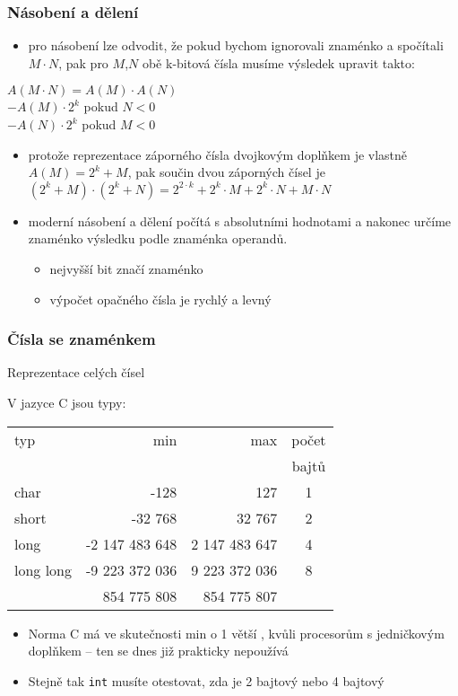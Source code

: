 \documentclass{beamer}
\begin{document}
\begin{frame}
\frametitle{Násobení a dělení}

\begin{itemize}
\item pro násobení lze odvodit, že pokud bychom ignorovali znaménko a spočítali $M\cdot N$, pak pro $M$,$N$ obě k-bitová čísla musíme výsledek upravit takto:
\end{itemize}
$A(M\cdot N) = A(M) \cdot A(N)$\\
\phantom{$A(M\cdot N)$ }$-A(M) \cdot 2^k$ \phantom{xxxxx} pokud $N<0$\\
\phantom{$A(M\cdot N)$ }$-A(N) \cdot 2^k$ \phantom{xxxxx} pokud $M<0$
\begin{itemize}
\item protože reprezentace záporného čísla dvojkovým doplňkem je vlastně $A(M) = 2^k+M$, pak součin dvou záporných čísel je $(2^k+M)\cdot (2^k+N) = 2^{2\cdot k}+2^k \cdot M + 2^k \cdot N + M \cdot N$
\end{itemize}
\begin{itemize}
\item moderní násobení a dělení počítá s absolutními hodnotami a nakonec určíme znaménko výsledku podle znaménka operandů.
\begin{itemize}
\item nejvyšší bit značí znaménko
\item výpočet opačného čísla je rychlý a levný
\end{itemize}
\end{itemize}
\end{frame}


\begin{frame}
\frametitle{Čísla se znaménkem}
Reprezentace celých čísel

V jazyce C jsou typy:
\begin{tabular}{|l|r|r|c|}\hline
typ & min & max & počet\\
 &  & &  bajtů\\ \hline
char & -128 & 127 & 1 \\ \hline
short & -32 768 & 32 767 & 2 \\ \hline 
long & -2 147 483 648 & 2 147 483 647 & 4 \\ \hline
long long & -9 223 372 036 & 9 223 372 036  & 8 \\ 
 & \phantom{xx} 854 775 808 & \phantom{xx}854 775 807 &  \\ \hline
\end{tabular}

\begin{itemize}
\item Norma C má ve skutečnosti min o 1 větší , kvůli procesorům s jedničkovým doplňkem -- ten se dnes již prakticky nepoužívá
\item Stejně tak \texttt{int} musíte otestovat, zda je 2 bajtový nebo 4 bajtový
\end{itemize}

\end{frame}
\end{document}
